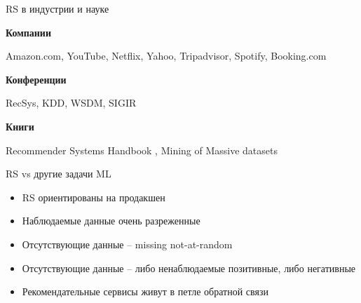 \documentclass[11pt,aspectratio=169,handout]{beamer}
\begin{document}
{
\begin{frame}[plain]
\end{frame}
}

\begin{frame}{RS в индустрии и науке}

{\bf Компании}

Amazon.com, YouTube, Netflix, Yahoo, Tripadvisor, Spotify, Booking.com

\vfill

{\bf Конференции}

RecSys, KDD, WSDM, SIGIR

\vfill

{\bf Книги}

Recommender Systems Handbook \cite{RSHB}, Mining of Massive datasets \cite{MMDS}

\end{frame}

\begin{frame}{RS vs другие задачи ML \cite{NETFLIX}}

\begin{itemize}[<+->]
\item RS ориентированы на продакшен
\item Наблюдаемые данные очень разреженные
\item Отсутствующие данные -- missing not-at-random
\item Отсутствующие данные -- либо ненаблюдаемые позитивные, либо негативные
\item Рекомендательные сервисы живут в петле обратной связи
\end{itemize}

\end{frame}
\end{document}
